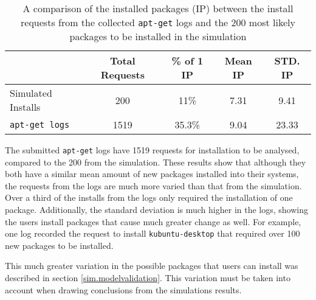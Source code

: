 \begin{table}[htp]
\begin{center}
\begin{tabular}{| l | c | c | c | c |}
\hline
& Total Requests & \% of 1 IP & Mean IP & STD. IP \\ \hline
Simulated Installs				& 200 	& 11\% 		 	& 7.31 	& 9.41 \\
\texttt{apt-get logs} 	& 1519 	& 35.3\% 	 	& 9.04 	& 23.33 \\ \hline
\end{tabular}
\end{center}
\caption[Comparison of installed packages between the collected \texttt{apt-get} logs and the simulation.]{A comparison of the installed packages (IP) between the install requests from the collected \texttt{apt-get} logs and the 200 most likely packages to be installed in the simulation}
\label{implementation.validlogs}
\end{table}
The submitted \texttt{apt-get} logs have 1519 requests for installation to be analysed, compared to the 200 from the simulation.
These results show that although they both have a similar mean amount of new packages installed into their systems, 
the requests from the logs are much more varied than that from the simulation.
Over a third of the installs from the logs only required the installation of one package.
Additionally, the standard deviation is much higher in the logs, showing the users install packages that cause much greater change as well.
For example, one log recorded the request to install \texttt{kubuntu-desktop} that required over 100 new packages to be installed.

This much greater variation in the possible packages that users can install was described in section \ref{sim.modelvalidation}.
This variation must be taken into account when drawing conclusions from the simulations results.

